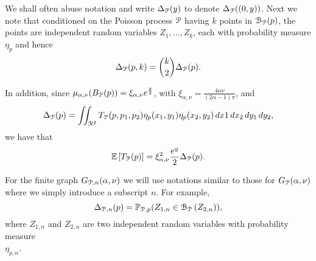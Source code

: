 We shall often abuse notation and write $\Delta_{{\mathcal P}}(y)$ to denote $\Delta_{{\mathcal P}}((0,y))$. %
Next we note that conditioned on the Poisson process ${\mathcal P}$ having $k$ points in $\mathcal{B}_{{\mathcal P}}(p)$, the points are independent random variables $Z_{1}, \dots, Z_{k}$, each with probability measure $\eta_{p}$ and hence
\[
	\Delta_{{\mathcal P}}(p,k) = \binom{k}{2} \Delta_{{\mathcal P}}(p).
\]

In addition, since $\mu_{\alpha, \nu}(B_{{\mathcal P}}(p)) = \xi_{\alpha,\nu} e^{\frac{y}{2}}$, with $\xi_{\alpha,\nu} = \frac{4\alpha\nu}{(2\alpha - 1)\pi}$, and
\[
	\Delta_{{\mathcal P}}(p) = \iint_{{\mathcal R}^2} T_{{\mathcal P}}(p,p_1,p_2) \eta_{p}(x_1,y_1)\eta_{p}(x_2,y_2) \, dx1 \, dx_2 \, dy_1 \, dy_2,
\]
we have that
\begin{equation}\label{eq:relation_T_vs_Delta_P}
	\mathbb{E}\left[T_{{\mathcal P}}(p)\right] = \xi_{\alpha,\nu}^2 \frac{e^{y}}{2} \Delta_{{\mathcal P}}(p).
\end{equation}

\begin{remark}\label{rmk:notations_clustering_P_n}
For the finite graph $G_{{\mathcal P},n}(\alpha, \nu)$ we will use notations similar to those for $G_{{\mathcal P}}(\alpha, \nu)$ where we simply introduce a subscript $n$. For example, 
\[
	\Delta_{{\mathcal P},n}(p) = \mathbb{P}_{\mathcal{P},p}( Z_{1,n} \in {\mathcal B}_{{\mathcal P}}\left(Z_{2,n}\right)),
\]
where $Z_{1,n}$ and $Z_{2,n}$ are two independent random variables with probability measure \\
$\eta_{p,n}$.
\end{remark}

